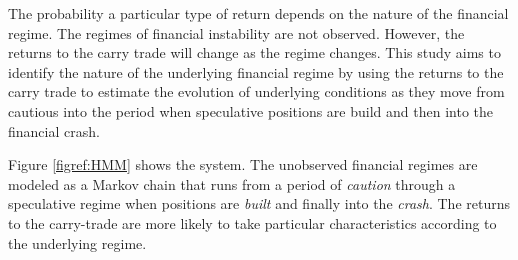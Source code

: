 \documentclass[12pt, a4paper, oneside]{article} %
\begin{document}
The probability a particular type of return depends on the nature of the financial regime.   The regimes of financial instability are not observed.  However, the returns to the carry trade will change as the regime changes. This study aims to identify the nature of the underlying financial regime by using the returns to the carry trade to estimate the evolution of underlying conditions as they move from cautious into the period when speculative positions are build and then into the financial crash. 

Figure \ref{figref:HMM} shows the system.  The unobserved financial regimes are modeled as a Markov chain that runs from a period of \emph{caution} through a speculative regime when positions are \emph{built} and finally into the \emph{crash}.  The returns to the carry-trade are more likely to take particular characteristics according to the underlying regime.   
\end{document}
